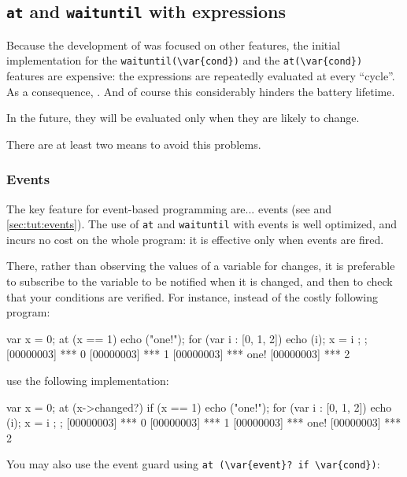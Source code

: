\subsection{\lstinline|at| and \lstinline|waituntil| with expressions}
\label{sec:faq:atexp}
Because the development of \us was focused on other features, the
initial implementation for the \lstinline|waituntil(\var{cond})| and
the \lstinline|at(\var{cond})| features are expensive: the expressions
 are repeatedly evaluated at every ``cycle''.  As a
consequence, .  And of
course this considerably hinders the battery lifetime.

In the future, they will be evaluated only when they are likely to
change.

There are at least two means to avoid this problems.

\subsubsection{Events}
The key \us feature for event-based programming are... events (see
 and \autoref{sec:tut:events}).  The use of
\lstinline|at| and \lstinline|waituntil| with events is well
optimized, and incurs no cost on the whole program: it is effective
only when events are fired.

There, rather than observing the values of a variable for changes, it
is preferable to subscribe to the variable to be notified when it is
changed, and then to check that your conditions are verified.  For
instance, instead of the costly following program:

\begin{urbiscript}
{
  var x = 0;
  at (x == 1)
    echo ("one!");
  for (var i : [0, 1, 2])
  {
    echo (i);
    x = i
  };
};
[00000003] *** 0
[00000003] *** 1
[00000003] *** one!
[00000003] *** 2
\end{urbiscript}

\noindent
use the following implementation:

\begin{urbiscript}
{
  var x = 0;
  at (x->changed?)
    if (x == 1)
      echo ("one!");
  for (var i : [0, 1, 2])
  {
    echo (i);
    x = i
  };
};
[00000003] *** 0
[00000003] *** 1
[00000003] *** one!
[00000003] *** 2
\end{urbiscript}

You may also use the event guard using %
\lstinline|at (\var{event}? if \var{cond})|:

